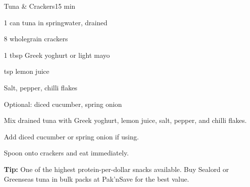\begin{recipebox}{Tuna \& Crackers}{1}{5 min}
\begin{ingredients}
  \item 1 can tuna in springwater, drained
  \item 8 wholegrain crackers
  \item 1 tbsp Greek yoghurt or light mayo
  \item \textonehalf{} tsp lemon juice
  \item Salt, pepper, chilli flakes
  \item Optional: diced cucumber, spring onion
\end{ingredients}

\begin{method}
  \item Mix drained tuna with Greek yoghurt, lemon juice, salt, pepper, and chilli flakes.
  \item Add diced cucumber or spring onion if using.
  \item Spoon onto crackers and eat immediately.
\end{method}

\begin{notelist}
  \item \textbf{Tip:} One of the highest protein-per-dollar snacks available. Buy Sealord or Greenseas tuna in bulk packs at Pak'nSave for the best value.
\end{notelist}
\end{recipebox}
